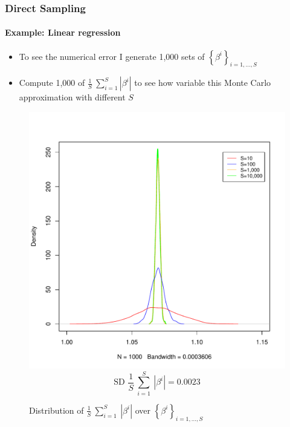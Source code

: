 \documentclass[
  shownotes,
  xcolor={svgnames},
  hyperref={colorlinks,citecolor=DarkBlue,linkcolor=DarkRed,urlcolor=DarkBlue}
  , aspectratio=169]{beamer}
\begin{document}
\begin{frame}[fragile]
\frametitle{Direct Sampling}
\framesubtitle{Example: Linear regression}

\begin{itemize}
\item To see the numerical error I generate 1,000 sets of $\left\{ \beta^{i} \right\}_{i = 1,\ldots,S}$

\item Compute 1,000 of $\frac{1}{S}\ \sum_{i = 1}^{S}\left| \beta^{i} \right|$ to see how variable this Monte Carlo approximation with different $S$

\end{itemize}



  \begin{figure}[H] \centering
  \centering
  \caption{Distribution of $\frac{1}{S}\ \sum_{i = 1}^{S}{\ \left| \beta^{i} \right|}$ over $\left\{ \beta^{i} \right\}_{i = 1,\ldots,S}$}
  \includegraphics[scale=0.2]{figures/n10000}
  \\
  \tiny 
  $$\text{SD\ }\frac{1}{S}\ \sum_{i = 1}^{S}{\ \left| \beta^{i} \right|} = 0.0023$$
\end{figure}  




 \end{frame}
\end{document}
